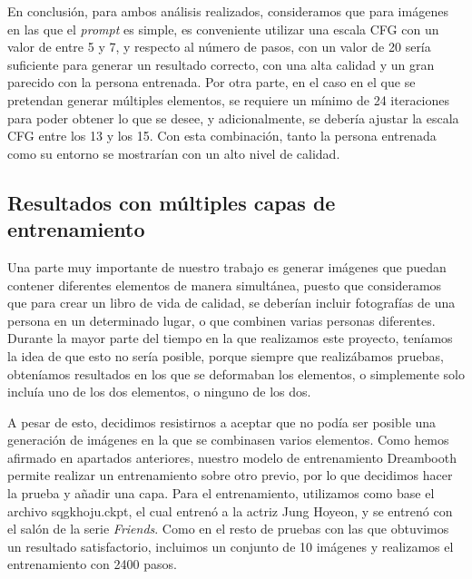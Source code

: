 En conclusión, para ambos análisis realizados, consideramos que para imágenes en las que el \textit{prompt} es simple, es conveniente utilizar una escala CFG con un valor de entre 5 y 7, y respecto al número de pasos, con un valor de 20 sería suficiente para generar un resultado correcto, con una alta calidad y un gran parecido con la persona entrenada. Por otra parte, en el caso en el que se pretendan generar múltiples elementos, se requiere un mínimo de 24 iteraciones para poder obtener lo que se desee, y adicionalmente, se debería ajustar la escala CFG entre los 13 y los 15. Con esta combinación, tanto la persona entrenada como su entorno se mostrarían con un alto nivel de calidad.



\subsection{Resultados con múltiples capas de entrenamiento}

Una parte muy importante de nuestro trabajo es generar imágenes que puedan contener diferentes elementos de manera simultánea, puesto que consideramos que para crear un libro de vida de calidad, se deberían incluir fotografías de una persona en un determinado lugar, o que combinen varias personas diferentes. Durante la mayor parte del tiempo en la que realizamos este proyecto, teníamos la idea de que esto no sería posible, porque siempre que realizábamos pruebas, obteníamos resultados en los que se deformaban los elementos, o simplemente solo incluía uno de los dos elementos, o ninguno de los dos. 

A pesar de esto, decidimos resistirnos a aceptar que no podía ser posible una generación de imágenes en la que se combinasen varios elementos. Como hemos afirmado en apartados anteriores, nuestro modelo de entrenamiento Dreambooth permite realizar un entrenamiento sobre otro previo, por lo que decidimos hacer la prueba y añadir una capa. Para el entrenamiento, utilizamos como base el archivo sqgkhoju.ckpt, el cual entrenó a la actriz Jung Hoyeon, y se entrenó con el salón de la serie \textit{Friends}. Como en el resto de pruebas con las que obtuvimos un resultado satisfactorio, incluimos un conjunto de 10 imágenes y realizamos el entrenamiento con 2400 pasos.\\


